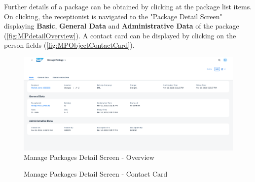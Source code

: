 Further details of a package can be obtained by clicking at the package list items. On clicking, the receptionist is navigated to the "Package Detail Screen" displaying \textbf{Basic}, \textbf{General Data} and \textbf{Administrative Data} of the package (\autoref{fig:MPdetailOverview}). 
A contact card can be displayed by clicking on the person fields (\autoref{fig:MPObjectContactCard}). 

\begin{figure}[H]
	\centering
	\includegraphics[width=1\linewidth]{images/user_doc/managePack/DetailScreen/browse/overview.png}
	\caption{Manage Packages Detail Screen - Overview}
	\label{fig:MPdetailOverview}
\end{figure}

\begin{figure}[H]
	\centering
	\hspace{2pt}
    \caption{Manage Packages Detail Screen - Contact Card}
	\label{fig:MPObjectContactCard}
\end{figure}

